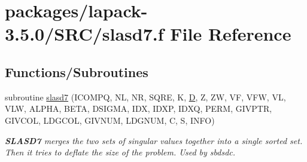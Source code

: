 \hypertarget{slasd7_8f}{}\section{packages/lapack-\/3.5.0/\+S\+R\+C/slasd7.f File Reference}
\label{slasd7_8f}
\subsection*{Functions/\+Subroutines}
\begin{DoxyCompactItemize}
\item 
subroutine \hyperlink{group__auxOTHERauxiliary_ga506889eb5029bb8325b9b2ac02a62bce}{slasd7} (I\+C\+O\+M\+P\+Q, N\+L, N\+R, S\+Q\+R\+E, K, \hyperlink{odrpack_8h_a7dae6ea403d00f3687f24a874e67d139}{D}, Z, Z\+W, V\+F, V\+F\+W, V\+L, V\+L\+W, A\+L\+P\+H\+A, B\+E\+T\+A, D\+S\+I\+G\+M\+A, I\+D\+X, I\+D\+X\+P, I\+D\+X\+Q, P\+E\+R\+M, G\+I\+V\+P\+T\+R, G\+I\+V\+C\+O\+L, L\+D\+G\+C\+O\+L, G\+I\+V\+N\+U\+M, L\+D\+G\+N\+U\+M, C, S, I\+N\+F\+O)
\begin{DoxyCompactList}\small\item\em {\bfseries S\+L\+A\+S\+D7} merges the two sets of singular values together into a single sorted set. Then it tries to deflate the size of the problem. Used by sbdsdc. \end{DoxyCompactList}\end{DoxyCompactItemize}
